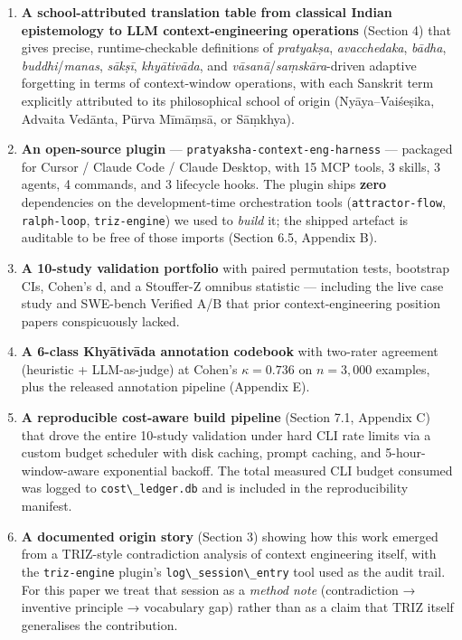 \begin{enumerate}
\def\labelenumi{\arabic{enumi}.}
\item
  \textbf{A school-attributed translation table from classical Indian epistemology to LLM context-engineering operations} (Section 4) that gives precise, runtime-checkable definitions of \emph{pratyakṣa}, \emph{avacchedaka}, \emph{bādha}, \emph{buddhi}/\emph{manas}, \emph{sākṣī}, \emph{khyātivāda}, and \emph{vāsanā}/\emph{saṃskāra}-driven adaptive forgetting in terms of context-window operations, with each Sanskrit term explicitly attributed to its philosophical school of origin (Nyāya--Vaiśeṣika, Advaita Vedānta, Pūrva Mīmāṃsā, or Sāṃkhya).
\item
  \textbf{An open-source plugin} --- \passthrough{\lstinline!pratyaksha-context-eng-harness!} --- packaged for Cursor / Claude Code / Claude Desktop, with 15 MCP tools, 3 skills, 3 agents, 4 commands, and 3 lifecycle hooks. The plugin ships \textbf{zero} dependencies on the development-time orchestration tools (\passthrough{\lstinline!attractor-flow!}, \passthrough{\lstinline!ralph-loop!}, \passthrough{\lstinline!triz-engine!}) we used to \emph{build} it; the shipped artefact is auditable to be free of those imports (Section 6.5, Appendix B).
\item
  \textbf{A 10-study validation portfolio} with paired permutation tests, bootstrap CIs, Cohen's d, and a Stouffer-Z omnibus statistic --- including the live case study and SWE-bench Verified A/B that prior context-engineering position papers conspicuously lacked.
\item
  \textbf{A 6-class Khyātivāda annotation codebook} with two-rater agreement (heuristic + LLM-as-judge) at Cohen's \(\kappa = \mathbf{0.736}\) on \(n = 3{,}000\) examples, plus the released annotation pipeline (Appendix E).
\item
  \textbf{A reproducible cost-aware build pipeline} (Section 7.1, Appendix C) that drove the entire 10-study validation under hard CLI rate limits via a custom budget scheduler with disk caching, prompt caching, and 5-hour-window-aware exponential backoff. The total measured CLI budget consumed was logged to \passthrough{\lstinline!cost\_ledger.db!} and is included in the reproducibility manifest.
\item
  \textbf{A documented origin story} (Section 3) showing how this work emerged from a TRIZ-style contradiction analysis of context engineering itself, with the \passthrough{\lstinline!triz-engine!} plugin's \passthrough{\lstinline!log\_session\_entry!} tool used as the audit trail. For this paper we treat that session as a \emph{method note} (contradiction → inventive principle → vocabulary gap) rather than as a claim that TRIZ itself generalises the contribution.
\end{enumerate}

